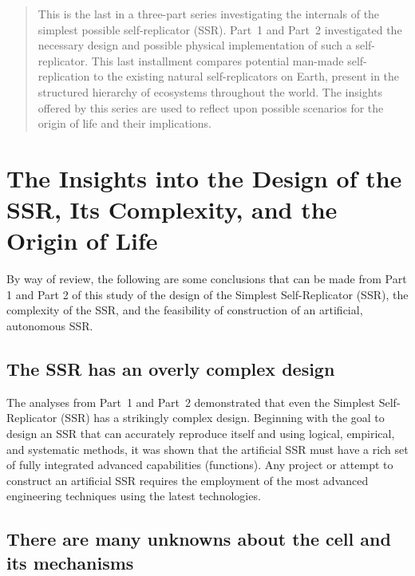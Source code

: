 
\begin{abstract}
This is the last in a three-part series investigating the internals 
of the simplest possible self-replicator (SSR).  
Part~1 and Part~2
investigated the necessary design and possible physical implementation of 
such a self-replicator.
This last installment compares potential man-made self-replication
to the existing natural self-replicators on Earth, present in the 
structured hierarchy of ecosystems throughout the world.
The insights offered by this series are used to
reflect upon possible scenarios for the origin of life and their implications.
\end{abstract}


\section{The Insights into the Design of the SSR, Its Complexity, and the Origin of Life}

By way of review, the following are some conclusions that can be made 
from Part 1 and Part 2 of this study of the design of the
Simplest Self-Replicator (SSR), the complexity of the SSR, and the feasibility of construction of
an artificial, autonomous SSR.

\subsection{The SSR has an overly complex design}

The analyses from Part~1 and Part~2 demonstrated that even the Simplest Self-Replicator (SSR)
has a strikingly complex design. 
Beginning with the goal to design an SSR that can accurately reproduce itself and using logical, empirical, and systematic methods, it was shown that the artificial 
SSR must have a rich set of fully integrated advanced
capabilities (functions).  Any project or attempt to construct an
artificial SSR requires the employment of the most advanced engineering
techniques using the latest technologies.

\subsection{There are many unknowns about the cell and its mechanisms}

